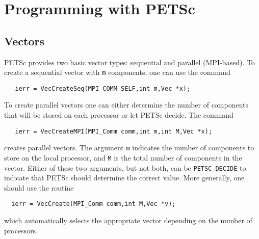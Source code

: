 \part{Programming with PETSc}
\label{part:usage}

\chapter{Vectors} 
\label{chapter:vectors}

PETSc provides two basic vector types: sequential and parallel
(MPI-based). To create a sequential vector with {\tt m} components,
one can
use the command  
\begin{verbatim}
   ierr = VecCreateSeq(MPI_COMM_SELF,int m,Vec *x);
\end{verbatim}
To create parallel vectors one can either determine the number of 
components that will be stored on each processor or let PETSc decide. 
The command 
\begin{verbatim}
   ierr = VecCreateMPI(MPI_Comm comm,int m,int M,Vec *x);
\end{verbatim}
creates parallel vectors. The argument {\tt m} indicates the number 
of components to store on the local processor, and {\tt M} is the 
total number of components in the vector.  Either of these two 
arguments, but not both, can be {\tt PETSC\_DECIDE} to 
 indicate that PETSc should determine the correct value. 
More generally, one should use the routine
\begin{verbatim}
  ierr = VecCreate(MPI_Comm comm,int M,Vec *v);
\end{verbatim}
which automatically selects the appropriate vector depending on the 
number of processors.

